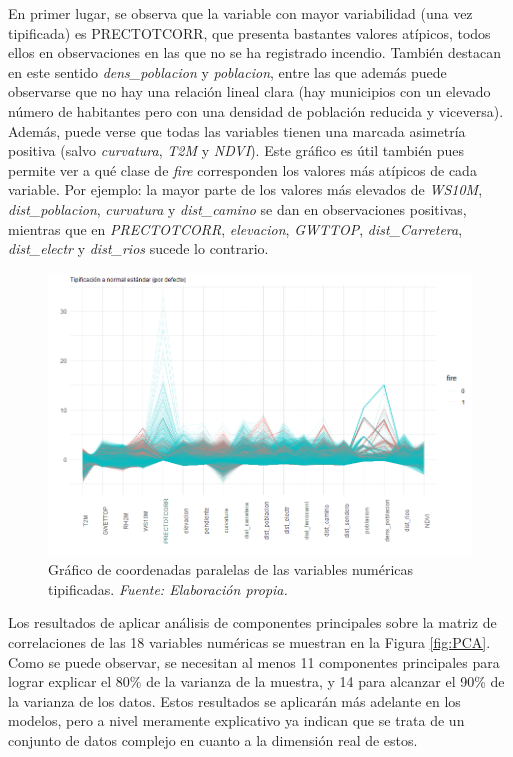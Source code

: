 \documentclass[12pt,a4paper,]{book}
\numberwithin{dummy}{section}
\theoremstyle{ocrenumbox}
\theoremstyle{blacknumex}
\theoremstyle{blacknumbox}
\theoremstyle{ocrenum}
\theoremstyle{ocrenum}
\begin{document}
En primer lugar, se observa que la variable con mayor variabilidad (una
vez tipificada) es PRECTOTCORR, que presenta bastantes valores atípicos,
todos ellos en observaciones en las que no se ha registrado incendio.
También destacan en este sentido \emph{dens\_poblacion} y
\emph{poblacion}, entre las que además puede observarse que no hay una
relación lineal clara (hay municipios con un elevado número de
habitantes pero con una densidad de población reducida y viceversa).
Además, puede verse que todas las variables tienen una marcada asimetría
positiva (salvo \emph{curvatura}, \emph{T2M} y \emph{NDVI}). Este
gráfico es útil también pues permite ver a qué clase de \emph{fire}
corresponden los valores más atípicos de cada variable. Por ejemplo: la
mayor parte de los valores más elevados de \emph{WS10M},
\emph{dist\_poblacion}, \emph{curvatura} y \emph{dist\_camino} se dan en
observaciones positivas, mientras que en \emph{PRECTOTCORR},
\emph{elevacion}, \emph{GWTTOP}, \emph{dist\_Carretera},
\emph{dist\_electr} y \emph{dist\_rios} sucede lo contrario.

\begin{figure}[h]
\centering
\includegraphics[width =\textwidth]{graficos/parcoord.png}
\caption[Gráfico de coordenadas paralelas de las variables numéricas tipificadas]{Gráfico de coordenadas paralelas de las variables numéricas tipificadas. \it Fuente: Elaboración propia.}
\label{fig:parcoord}
\end{figure}

Los resultados de aplicar análisis de componentes principales sobre la
matriz de correlaciones de las 18 variables numéricas se muestran en la
Figura \ref{fig:PCA}. Como se puede observar, se necesitan al menos 11
componentes principales para lograr explicar el 80\% de la varianza de
la muestra, y 14 para alcanzar el 90\% de la varianza de los datos.
Estos resultados se aplicarán más adelante en los modelos, pero a nivel
meramente explicativo ya indican que se trata de un conjunto de datos
complejo en cuanto a la dimensión real de estos.
\end{document}
